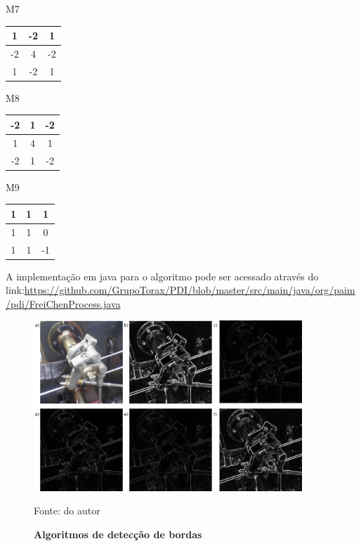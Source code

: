 \documentclass[
	12pt,				%
	oneside,			%
	a4paper,			%
	english,			%
	french,				%
	spanish,			%
	brazil,				%
	]{abntex2}
\begin{document}
\begin{center}
M7
\begin{tabular}{|c|c|c|}
    \hline
                 1 &            -2 &  1              \\ \hline
	            -2 &             4 & -2              \\ \hline   
	             1 &            -2 &  1              \\ \hline   
\end{tabular}
M8
\begin{tabular}{|c|c|c|}
    \hline
     	 	 	-2 &             1 & -2              \\ \hline
	             1 &             4 &  1             \\ \hline   
	            -2 &             1 & -2             \\ \hline   
\end{tabular}
M9
\begin{tabular}{|c|c|c|}
    \hline
     	 	 	 1 &             1 &  1            \\ \hline
	             1 &             1 &  0             \\ \hline   
	             1 &             1 & -1             \\ \hline   
\end{tabular}
\end{center}

A implementação em java para o algoritmo pode ser acessado através do link:\url{https://github.com/GrupoTorax/PDI/blob/master/src/main/java/org/paim/pdi/FreiChenProcess.java}

\begin{figure}[ht]
\centering
\caption{\textbf{Algoritmos de detecção de bordas}}
\includegraphics[width=0.9\textwidth]{imagens/deteccao_bordas.png}

Fonte: do autor
\label{fig:deteccao_bordas}
\end{figure}
\end{document}
